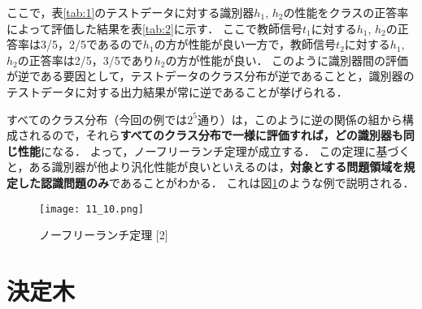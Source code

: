 \documentclass[dvipdfmx]{jreport}
\begin{document}
\newpage
ここで，表\ref{tab:1}のテストデータに対する識別器$h_1$, $h_2$の性能をクラスの正答率によって評価した結果を表\ref{tab:2}に示す．
ここで教師信号$t_1$に対する$h_1$, $h_2$の正答率は3/5，2/5であるので$h_1$の方が性能が良い一方で，教師信号$t_2$に対する$h_1$, $h_2$の正答率は2/5，3/5であり$h_2$の方が性能が良い．
このように識別器間の評価が逆である要因として，テストデータのクラス分布が逆であることと，識別器のテストデータに対する出力結果が常に逆であることが挙げられる．

すべてのクラス分布（今回の例では$2^5$通り）は，このように逆の関係の組から構成されるので，それら\textbf{すべてのクラス分布で一様に評価すれば，どの識別器も同じ性能}になる．
よって，ノーフリーランチ定理が成立する．
この定理に基づくと，ある識別器が他より汎化性能が良いといえるのは，\textbf{対象とする問題領域を規定した認識問題のみ}であることがわかる．
これは図\ref{fig:10}のような例で説明される．

\begin{figure}[h]
    \begin{center}
        \texttt{[image: 11\_10.png]}
        \caption{ノーフリーランチ定理 [2]} \label{fig:10}
    \end{center}
\end{figure}

\section{決定木}
\end{document}
